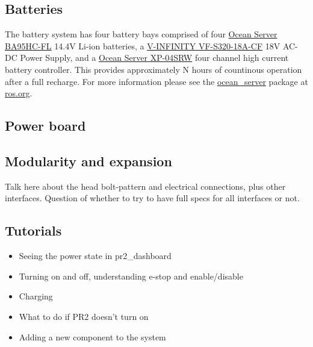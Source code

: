 \subsection{Batteries}
The battery system has four battery bays comprised of four \href{http://www.oceanserver-store.com/18.html}{Ocean Server BA95HC-FL}
14.4V Li-ion batteries, a \href{http://www.v-infinity.com/adtemplate_child.asp?c=710918&p=903285&catky=764537&subcatky1=46887&subcatky2=320934}{V-INFINITY VF-S320-18A-CF}
18V AC-DC Power Supply, and a \href{http://www.oceanserver-store.com/xpmibamamo.html}{Ocean Server XP-04SRW} four channel high current battery controller. 
This provides approximately N hours of countinous operation after a full recharge. For more information please see the 
\href{http://www.ros.org/wiki/ocean\_server}{ocean\_server} package at \href{http://www.ros.org}{ros.org}.

\subsection{Power board}

\subsection{Modularity and expansion}
Talk here about the head bolt-pattern and electrical connections, plus other interfaces.  Question of whether to try to have full specs for all interfaces or not.
\subsection{Tutorials} 
\begin{itemize}
\item{Seeing the power state in pr2\_dashboard}
\item{Turning on and off, understanding e-stop and enable/disable}
\item{Charging}
\item{What to do if PR2 doesn't turn on}
\item{Adding a new component to the system}
\end{itemize}


